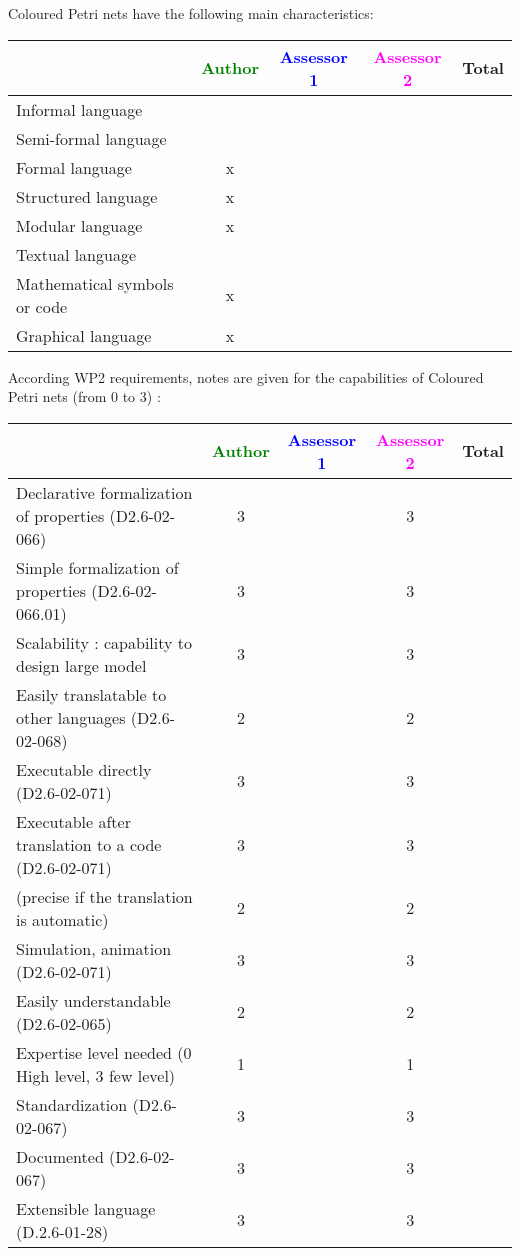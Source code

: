 Coloured Petri nets have the following main characteristics:

\begin{tabular}{|l | c | c | c | c|}
\hline
& \textcolor{green}{Author} & \textcolor{blue}{Assessor 1} & \textcolor{magenta}{Assessor 2} & Total \\
\hline 
Informal language & & & &  \\
\hline 
Semi-formal language & & & &  \\
\hline
Formal language & x & & &  \\
\hline
Structured language & x & & & \\
\hline
Modular language & x & & & \\
\hline
Textual language & & & & \\
\hline
Mathematical symbols or code & x & & & \\
\hline
Graphical language & x & & & \\
\hline
\end{tabular}

According WP2 requirements, notes are given for the capabilities of Coloured Petri nets (from 0 to 3) :

\begin{tabular}{|l | c | c | c | c|}
\hline
& \textcolor{green}{Author} & \textcolor{blue}{Assessor 1} & \textcolor{magenta}{Assessor 2} & Total \\
\hline
Declarative formalization of properties (D2.6-02-066) & 3    & & 3    & \\
\hline
Simple formalization of properties (D2.6-02-066.01) & 3    & & 3    & \\
\hline
Scalability : capability to design large model & 3    & & 3    & \\
\hline
Easily translatable to other languages (D2.6-02-068) & 2    & & 2    & \\
\hline
Executable directly (D2.6-02-071) & 3    & & 3    & \\
\hline
Executable after translation to a code (D2.6-02-071) & 3    & & 3    & \\
(precise if the translation is automatic) & 2    & & 2    & \\
\hline
Simulation, animation (D2.6-02-071) & 3    & & 3    & \\
\hline
Easily understandable (D2.6-02-065) & 2    & & 2    & \\
\hline
Expertise level needed (0 High level, 3 few level) & 1    & & 1    & \\
\hline
Standardization (D2.6-02-067) & 3    & & 3    & \\
\hline
Documented (D2.6-02-067) & 3    & & 3    & \\
\hline
Extensible language (D.2.6-01-28) & 3    & & 3    & \\
\hline
\end{tabular}


